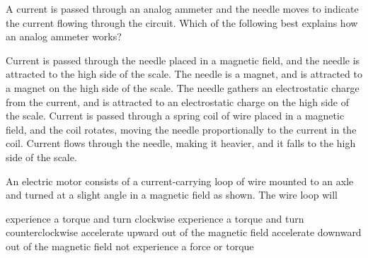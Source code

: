 \documentclass{../../../oss-apphys-exam}
\newcounter{last}
\begin{document}
\begin{questions}
  \question A current is passed through an analog ammeter and the needle moves
  to indicate the current flowing through the circuit. Which of the
  following best explains how an analog ammeter works?
  \begin{choices}
    \choice Current is passed through the needle placed in a magnetic field,
    and the needle is attracted to the high side of the scale.
    \choice The needle is a magnet, and is attracted to a magnet on the high
    side of the scale.
    \choice The needle gathers an electrostatic charge from the current, and
    is attracted to an electrostatic charge on the high side of the scale.
    \choice Current is passed through a spring coil of wire placed in a
    magnetic field, and the coil rotates, moving the needle
    proportionally to the current in the coil.
    \choice Current flows through the needle, making it heavier, and it falls
    to the high side of the scale.
  \end{choices}
  \newpage
  
  \question An electric motor consists of a current-carrying loop of wire
  mounted to an axle and turned at a slight angle in a magnetic field as
  shown. The wire loop will
  \begin{choices}
    \choice experience a torque and turn clockwise
    \choice experience a torque and turn counterclockwise
    \choice accelerate upward out of the magnetic field
    \choice accelerate downward out of the magnetic field
    \choice not experience a force or torque
  \end{choices}
\end{questions}
\setcounter{last}{\value{question}}
\newpage

\end{document}
